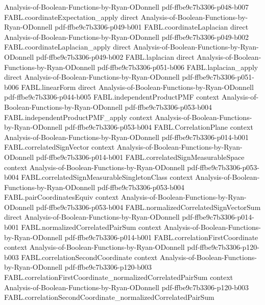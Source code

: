 \begin{theorem}
  {Analysis-of-Boolean-Functions-by-Ryan-ODonnell}
  {pdf-ffbe9c7b3306-p048-b007}
\proofstep
  {FABL.coordinateExpectation_apply}
  {direct}
  {Analysis-of-Boolean-Functions-by-Ryan-ODonnell}
  {pdf-ffbe9c7b3306-p049-b001}
\proofstep
  {FABL.coordinateLaplacian}
  {direct}
  {Analysis-of-Boolean-Functions-by-Ryan-ODonnell}
  {pdf-ffbe9c7b3306-p049-b002}
\proofstep
  {FABL.coordinateLaplacian_apply}
  {direct}
  {Analysis-of-Boolean-Functions-by-Ryan-ODonnell}
  {pdf-ffbe9c7b3306-p049-b002}
\proofstep
  {FABL.laplacian}
  {direct}
  {Analysis-of-Boolean-Functions-by-Ryan-ODonnell}
  {pdf-ffbe9c7b3306-p051-b006}
\proofstep
  {FABL.laplacian_apply}
  {direct}
  {Analysis-of-Boolean-Functions-by-Ryan-ODonnell}
  {pdf-ffbe9c7b3306-p051-b006}
\proofstep
  {FABL.linearForm}
  {direct}
  {Analysis-of-Boolean-Functions-by-Ryan-ODonnell}
  {pdf-ffbe9c7b3306-p044-b005}
\proofstep
  {FABL.independentProductPMF}
  {context}
  {Analysis-of-Boolean-Functions-by-Ryan-ODonnell}
  {pdf-ffbe9c7b3306-p053-b004}
\proofstep
  {FABL.independentProductPMF_apply}
  {context}
  {Analysis-of-Boolean-Functions-by-Ryan-ODonnell}
  {pdf-ffbe9c7b3306-p053-b004}
\proofstep
  {FABL.CorrelationPlane}
  {context}
  {Analysis-of-Boolean-Functions-by-Ryan-ODonnell}
  {pdf-ffbe9c7b3306-p014-b001}
\proofstep
  {FABL.correlatedSignVector}
  {context}
  {Analysis-of-Boolean-Functions-by-Ryan-ODonnell}
  {pdf-ffbe9c7b3306-p014-b001}
\proofstep
  {FABL.correlatedSignMeasurableSpace}
  {context}
  {Analysis-of-Boolean-Functions-by-Ryan-ODonnell}
  {pdf-ffbe9c7b3306-p053-b004}
\proofstep
  {FABL.correlatedSignMeasurableSingletonClass}
  {context}
  {Analysis-of-Boolean-Functions-by-Ryan-ODonnell}
  {pdf-ffbe9c7b3306-p053-b004}
\proofstep
  {FABL.pairCoordinatesEquiv}
  {context}
  {Analysis-of-Boolean-Functions-by-Ryan-ODonnell}
  {pdf-ffbe9c7b3306-p053-b004}
\proofstep
  {FABL.normalizedCorrelatedSignVectorSum}
  {direct}
  {Analysis-of-Boolean-Functions-by-Ryan-ODonnell}
  {pdf-ffbe9c7b3306-p014-b001}
\proofstep
  {FABL.normalizedCorrelatedPairSum}
  {context}
  {Analysis-of-Boolean-Functions-by-Ryan-ODonnell}
  {pdf-ffbe9c7b3306-p014-b001}
\proofstep
  {FABL.correlationFirstCoordinate}
  {context}
  {Analysis-of-Boolean-Functions-by-Ryan-ODonnell}
  {pdf-ffbe9c7b3306-p120-b003}
\proofstep
  {FABL.correlationSecondCoordinate}
  {context}
  {Analysis-of-Boolean-Functions-by-Ryan-ODonnell}
  {pdf-ffbe9c7b3306-p120-b003}
\proofstep
  {FABL.correlationFirstCoordinate_normalizedCorrelatedPairSum}
  {context}
  {Analysis-of-Boolean-Functions-by-Ryan-ODonnell}
  {pdf-ffbe9c7b3306-p120-b003}
\proofstep
  {FABL.correlationSecondCoordinate_normalizedCorrelatedPairSum}

\end{theorem}
